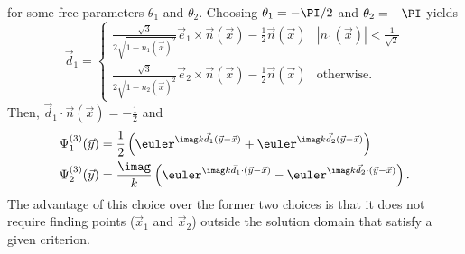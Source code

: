 for some free parameters $\theta_1$ and $\theta_2$. Choosing $\theta_1=-\PI/2$ and $\theta_2=-\PI$ yields
\begin{equation}\label{Eq3:d1d2}
	\vec{d}_1 = \begin{cases}\frac{\sqrt{3}}{2\sqrt{1-n_1(\vec{x})^2}}\vec{e}_1\times\vec{n}(\vec{x})-\frac{1}{2}\vec{n}(\vec{x}) & |n_1(\vec{x})| < \frac{1}{\sqrt{2}}\\
	\frac{\sqrt{3}}{2\sqrt{1-n_2(\vec{x})^2}}\vec{e}_2\times\vec{n}(\vec{x})-\frac{1}{2}\vec{n}(\vec{x}) & \text{otherwise.}
	\end{cases}
\end{equation}
Then, $\vec{d}_1\cdot\vec{n}(\vec{x}) = -\frac{1}{2}$ and
\begin{equation}
\begin{aligned}
	\Psi_1^{(3)}(\vec{y}) &= \frac12\left(\euler^{\imag k\vec{d}_1(\vec{y}-\vec{x})} +\euler^{\imag k\vec{d}_2(\vec{y}-\vec{x})}\right)\\
	\Psi_2^{(3)}(\vec{y}) &= \frac{\imag}{k}\left(\euler^{\imag k\vec{d}_1\cdot(\vec{y}-\vec{x})}-\euler^{\imag k\vec{d}_2\cdot(\vec{y}-\vec{x})}\right).
\end{aligned}	
\end{equation}
The advantage of this choice over the former two choices is that it does not require finding points ($\vec{x}_1$ and $\vec{x}_2$) outside the solution domain that satisfy a given criterion.

